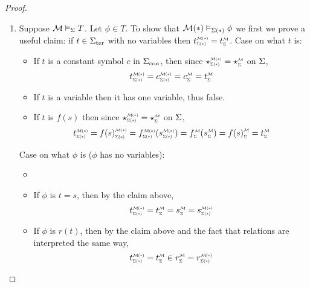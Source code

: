 \begin{proof}~
    \begin{enumerate}
        \item Suppose $\mathcal{M} \vDash_{\Sigma} T$.
        Let $\phi \in T$.
        To show that 
        $\mathcal{M}(*) \vDash_{\Sigma(*)} \phi$ we
        first we prove a useful claim:
        if $t \in {\Sigma}_\mathrm{ter}$ with no variables then 
        $\subintp{\Si(*)}{\MM(*)}{t} = \subintp{\Si}{\MM}{t}$.
        Case on what $t$ is:
        \begin{itemize}
            \item If $t$ is a constant symbol $c$ in ${\Sigma}_\mathrm{con}$, 
                then since $\intp{\Si(*)}{\MM(*)} = 
                    \intp{\Si}{\MM}$ on $\Sigma$,
                \[\subintp{\Si(*)}{\MM(*)}{t} = 
                    \subintp{\Si(*)}{\MM(*)}{c} =
                    \subintp{\Si}{\MM}{c} =
                    \subintp{\Si}{\MM}{t}\]
            \item If $t$ is a variable then it has one variable,
            thus false.
            \item If $t$ is $f(s)$ then since 
            $\intp{\Si(*)}{\MM(*)} = 
            \intp{\Si}{\MM}$ on $\Sigma$,
            \[
                \subintp{\Si(*)}{\MM(*)}{t} =
                \subintp{\Si(*)}{\MM(*)}{f(s)} =
                \subintp{\Si(*)}{\MM(*)}{f}(\subintp{\Si(*)}{\MM(*)}{s}) =
                \subintp{\Si}{\MM}{f}(\subintp{\Si}{\MM}{s}) =
                \subintp{\Si}{\MM}{f(s)} =
                \subintp{\Si}{\MM}{t}
            \]
        \end{itemize}
        Case on what $\phi$ is ($\phi$ has no variables):
        \begin{itemize}
            \item {}
            \item If $\phi$ is $t = s$, 
                then by the claim above,
                \[
                    \subintp{\Si(*)}{\MM(*)}{t} = 
                    \subintp{\Si}{\MM}{t} = 
                    \subintp{\Si}{\MM}{s} = 
                    \subintp{\Si(*)}{\MM(*)}{s}
                \]
            \item If $\phi$ is $r(t)$,
                then by the claim above
                and the fact that relations are interpreted the same way,
                \[
                    \subintp{\Si(*)}{\MM(*)}{t} = 
                    \subintp{\Si}{\MM}{t} \in
                    \subintp{\Si}{\MM}{r} = 
                    \subintp{\Si(*)}{\MM(*)}{r}
\]
\end{itemize}
\end{enumerate}
\end{proof}
